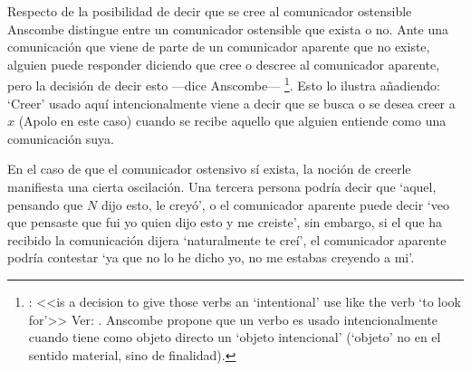Respecto de la posibilidad de decir que se cree al comunicador ostensible
Anscombe distingue entre un comunicador ostensible que exista o no. Ante una
comunicación que viene de parte de un comunicador aparente que no existe,
alguien puede responder diciendo que cree o descree al comunicador aparente,
pero la decisión de decir esto ---dice Anscombe--- \footnote{\cite[7]{anscombe2008faith:tobelieve}: <<is a decision to give
  those verbs an `intentional' use like the verb `to look for'>> Ver:
  \cite{anscombe1981metaphysics:intsens}. Anscombe propone que un verbo es usado
  intencionalmente cuando tiene como objeto directo un `objeto intencional'
  (`objeto' no en el sentido material, sino de finalidad).}. Esto lo ilustra
añadiendo:  `Creer' usado aquí intencionalmente viene a decir
que se busca o se desea creer a $x$ (Apolo en este caso) cuando se recibe
aquello que alguien entiende como una comunicación suya.

En el caso de que el comunicador ostensivo sí exista, la noción de creerle
manifiesta una cierta oscilación. Una tercera persona podría decir que `aquel,
pensando que $N$ dijo esto, le creyó', o el comunicador aparente puede decir
`veo que pensaste que fui yo quien dijo esto y me creiste', sin embargo, si el
que ha recibido la comunicación dijera `naturalmente te creí', el comunicador
aparente podría contestar `ya que no lo he dicho yo, no me estabas creyendo a
mi'\autocite[Cf.~][8]{anscombe2008faith:tobelieve}.

